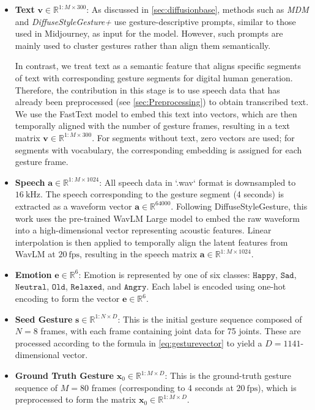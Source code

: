 \begin{itemize}
	\item \textbf{Text} $\mathbf{v} \in \mathbb{R}^{1:M \times 300}$:  
	As discussed in \autoref{sec:diffusionbase}, methods such as \textit{MDM} \cite{tevet2022human} and \textit{DiffuseStyleGesture+} \cite{yang2022DiffuseStyleGestureplus} use gesture-descriptive prompts, similar to those used in Midjourney, as input for the model. However, such prompts are mainly used to cluster gestures rather than align them semantically. 
	
	In contrast, we treat text as a semantic feature that aligns specific segments of text with corresponding gesture segments for digital human generation. Therefore, the contribution in this stage is to use speech data that has already been preprocessed (see \autoref{sec:Preprocessing}) to obtain transcribed text. We use the FastText model \cite{bojanowski2017enriching} to embed this text into vectors, which are then temporally aligned with the number of gesture frames, resulting in a text matrix $\mathbf{v} \in \mathbb{R}^{1:M \times 300}$. For segments without text, zero vectors are used; for segments with vocabulary, the corresponding embedding is assigned for each gesture frame.
	
	\item \textbf{Speech} $\mathbf{a} \in \mathbb{R}^{1:M \times 1024}$:  
	All speech data in `.wav` format is downsampled to $16~\mathrm{kHz}$. The speech corresponding to the gesture segment (4 seconds) is extracted as a waveform vector $\mathbf{a} \in \mathbb{R}^{64000}$. Following DiffuseStyleGesture, this work uses the pre-trained WavLM Large model \cite{Chen_2022} to embed the raw waveform into a high-dimensional vector representing acoustic features. Linear interpolation is then applied to temporally align the latent features from WavLM at $20~\text{fps}$, resulting in the speech matrix $\mathbf{a} \in \mathbb{R}^{1:M \times 1024}$.
	
	\item \textbf{Emotion} $\mathbf{e} \in \mathbb{R}^{6}$:  
	Emotion is represented by one of six classes: $\texttt{Happy}$, $\texttt{Sad}$, $\texttt{Neutral}$, $\texttt{Old}$, $\texttt{Relaxed}$, and $\texttt{Angry}$.  
	Each label is encoded using one-hot encoding to form the vector $\mathbf{e} \in \mathbb{R}^{6}$.
	
	\item \textbf{Seed Gesture} $\mathbf{s} \in \mathbb{R}^{1:N \times D}$:  
	This is the initial gesture sequence composed of $N=8$ frames, with each frame containing joint data for 75 joints. These are processed according to the formula in \autoref{eq:gesturevector} to yield a $D=1141$-dimensional vector.
	
	\item \textbf{Ground Truth Gesture} $\mathbf{x}_{0} \in \mathbb{R}^{1:M \times D}$:  
	This is the ground-truth gesture sequence of $M = 80$ frames (corresponding to 4 seconds at $20~\text{fps}$), which is preprocessed to form the matrix $\mathbf{x}_{0} \in \mathbb{R}^{1:M \times D}$.
\end{itemize}

